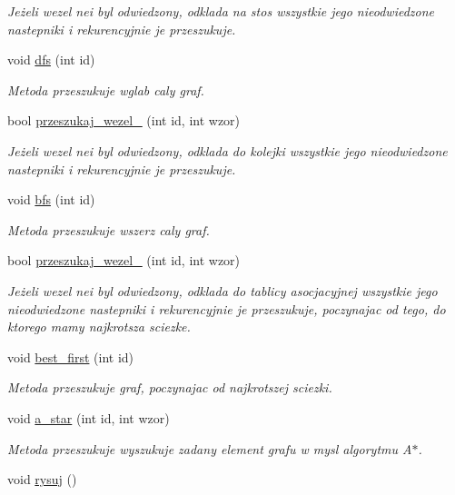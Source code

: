 \begin{DoxyCompactItemize}
\begin{DoxyCompactList}\small\item\em Jeżeli wezel nei byl odwiedzony, odklada na stos wszystkie jego nieodwiedzone nastepniki i rekurencyjnie je przeszukuje. \end{DoxyCompactList}\item 
void \hyperlink{classgraf_ac87b0c158f92d78cc9ccaabc8ce5fcd2}{dfs} (int id)
\begin{DoxyCompactList}\small\item\em Metoda przeszukuje wglab caly graf. \end{DoxyCompactList}\item 
bool \hyperlink{classgraf_ab10b43b2e8b685118790a550674ab00e}{przeszukaj\-\_\-wezel\-\_} (int id, int wzor)
\begin{DoxyCompactList}\small\item\em Jeżeli wezel nei byl odwiedzony, odklada do kolejki wszystkie jego nieodwiedzone nastepniki i rekurencyjnie je przeszukuje. \end{DoxyCompactList}\item 
void \hyperlink{classgraf_a51bb320791ada3c7700fa90477b508f4}{bfs} (int id)
\begin{DoxyCompactList}\small\item\em Metoda przeszukuje wszerz caly graf. \end{DoxyCompactList}\item 
bool \hyperlink{classgraf_abf0a6bb0cfd8ef55868981bb91881de3}{przeszukaj\-\_\-wezel\-\_} (int id, int wzor)
\begin{DoxyCompactList}\small\item\em Jeżeli wezel nei byl odwiedzony, odklada do tablicy asocjacyjnej wszystkie jego nieodwiedzone nastepniki i rekurencyjnie je przeszukuje, poczynajac od tego, do ktorego mamy najkrotsza sciezke. \end{DoxyCompactList}\item 
void \hyperlink{classgraf_ac7c83abd9cf9ee4d3d9dfb1fdbf157a1}{best\-\_\-first} (int id)
\begin{DoxyCompactList}\small\item\em Metoda przeszukuje graf, poczynajac od najkrotszej sciezki. \end{DoxyCompactList}\item 
void \hyperlink{classgraf_aa0a5bfb4cb8a7d76620804cbc6230752}{a\-\_\-star} (int id, int wzor)
\begin{DoxyCompactList}\small\item\em Metoda przeszukuje wyszukuje zadany element grafu w mysl algorytmu A$\ast$. \end{DoxyCompactList}\item 
void \hyperlink{classgraf_ab3d25f79040645495cda405bdc4975e8}{rysuj} ()
\end{DoxyCompactItemize}
